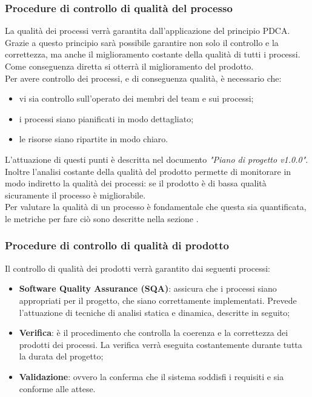 \documentclass[12pt,a4paper,titlepage]{article}
\begin{document}
\subsubsection{Procedure di controllo di qualità del processo}
	La qualità dei processi verrà garantita dall'applicazione del principio PDCA. Grazie a questo principio sarà possibile garantire non solo il controllo e la correttezza, ma anche il miglioramento costante della qualità di tutti i processi. Come conseguenza diretta si otterrà il miglioramento del prodotto.\\
	Per avere controllo dei processi, e di conseguenza qualità, è necessario che:
	\begin{itemize}
		\item vi sia controllo sull'operato dei membri del team e sui processi;
		\item i processi siano pianificati in modo dettagliato;
		\item le risorse siano ripartite in modo chiaro.
	\end{itemize}
	L'attuazione di questi punti è descritta nel documento \textit{"Piano di progetto v1.0.0"}. Inoltre l'analisi costante della qualità del prodotto permette di monitorare in modo indiretto la qualità dei processi: se il prodotto è di bassa qualità sicuramente il processo è migliorabile.\\
	Per valutare la qualità di un processo è fondamentale che questa sia quantificata, le metriche per fare ciò sono descritte nella sezione .
	\subsubsection{Procedure di controllo di qualità di prodotto}
	Il controllo di qualità dei prodotti verrà garantito dai seguenti processi:
	\begin{itemize}
		\item \textbf{Software Quality Assurance (SQA)}: assicura che i processi siano appropriati per il progetto, che siano correttamente implementati. Prevede l'attuazione di tecniche di analisi statica e dinamica, descritte in seguito;
		\item \textbf{Verifica}: è il procedimento che controlla la coerenza e la correttezza dei prodotti dei processi. La verifica verrà eseguita costantemente durante tutta la durata del progetto;
		\item \textbf{Validazione}: ovvero la conferma che il sistema soddisfi i requisiti e sia conforme alle attese.
	\end{itemize}
\end{document}
